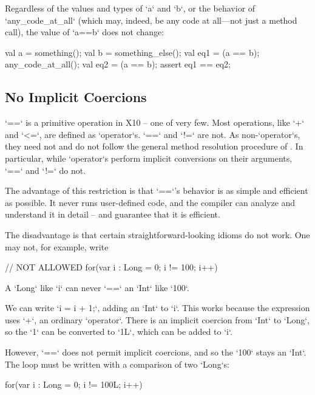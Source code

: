 \begin{ex}
Regardless of the values and types of \xcd`a` and \xcd`b`, 
or the behavior of \xcd`any_code_at_all` (which may, indeed, be
any code at all---not just a method call), the value of 
\xcd`a==b` does not change: 
\begin{xten}
val a = something();
val b = something_else();
val eq1 = (a == b);
any_code_at_all();
val eq2 = (a == b);
assert eq1 == eq2;
\end{xten}
\end{ex}



\subsection{No Implicit Coercions}
\label{sect:eqeq-no-coerce}

\xcd`==` is a primitive operation in X10 -- one of very few. Most operations,
like \xcd`+` and \xcd`<=`, are defined as \xcd`operator`s. \xcd`==` and
\xcd`!=` are not. As non-\xcd`operator`s, they need not and do not follow the
general method resolution procedure of . In
particular, while \xcd`operator`s perform implicit conversions on their
arguments, \xcd`==` and \xcd`!=` do not.

The advantage of this restriction is that \xcd`==`'s behavior is as simple and
efficient as possible.  It never runs user-defined code, and the compiler can
analyze and understand it in detail -- and guarantee that it is efficient.

The disadvantage is that certain straightforward-looking idioms do not work.
One may not, for example, write
\begin{xten}
// NOT ALLOWED
for(var i : Long = 0; i != 100; i++) 
\end{xten}
A \xcd`Long` like \xcd`i` can never \xcd`==` an \xcd`Int` like \xcd`100`.

We can write \xcd`i = i + 1;`, adding an \xcd`Int` to \xcd`i`. This works 
because the expression uses \xcd`+`,  an ordinary \xcd`operator`.
There is an implicit coercion from \xcd`Int` to \xcd`Long`, so the
\xcd`1` can be converted to \xcd`1L`, which can be added to \xcd`i`.  

However, \xcd`==` does not permit implicit coercions, and so the \xcd`100`
stays an \xcd`Int`.  The loop must be written with a comparison of two
\xcd`Long`s: 
\begin{xten}
for(var i : Long = 0; i != 100L; i++) 
\end{xten}

